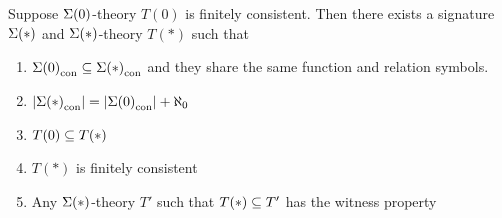 \begin{prop}
    Suppose $\Sigma(0)$-theory 
    $T(0)$ is finitely consistent.
    Then there exists a signature 
    $\Sigma(*)$ and $\Sigma(*)$-theory $T(*)$ such that 
    \begin{enumerate}
        \item ${\Sigma(0)}_\mathrm{con} \subseteq {\Sigma(*)}_\mathrm{con}$
        and they share the same function and relation symbols.
        \item $|{\Sigma(*)}_\mathrm{con}| = |{\Sigma(0)}_\mathrm{con}| + \aleph_0$
        \item $T(0) \subseteq T(*)$
        \item $T(*)$ is finitely consistent
        \item Any $\Sigma(*)$-theory $T'$ such that $T(*) \subseteq T'$ 
        has the witness property
    \end{enumerate}
\end{prop}

